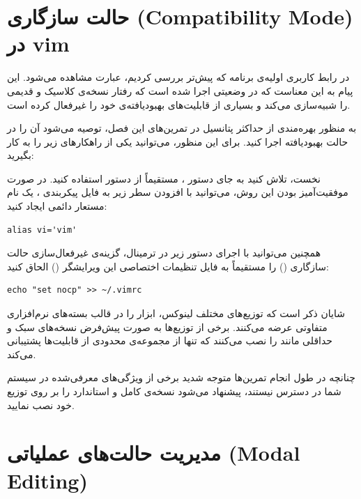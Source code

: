 \section{حالت سازگاری (Compatibility Mode) در vim}

در رابط کاربری اولیه‌ی برنامه که پیش‌تر بررسی کردیم، عبارت  مشاهده می‌شود. این پیام به این معناست که  در وضعیتی اجرا شده است که رفتار نسخه‌ی کلاسیک و قدیمی  را شبیه‌سازی می‌کند و بسیاری از قابلیت‌های بهبودیافته‌ی خود را غیرفعال کرده است.

به منظور بهره‌مندی از حداکثر پتانسیل  در تمرین‌های این فصل، توصیه می‌شود آن را در حالت بهبودیافته اجرا کنید. برای این منظور، می‌توانید یکی از راهکارهای زیر را به کار بگیرید:

نخست، تلاش کنید به جای دستور ، مستقیماً از دستور  استفاده کنید. در صورت موفقیت‌آمیز بودن این روش، می‌توانید با افزودن سطر زیر به فایل پیکربندی ، یک نام مستعار دائمی ایجاد کنید:

\begin{latin}
\begin{lstlisting}
alias vi='vim'
\end{lstlisting}
\end{latin}

همچنین می‌توانید با اجرای دستور زیر در ترمینال، گزینه‌ی غیرفعال‌سازی حالت سازگاری () را مستقیماً به فایل تنظیمات اختصاصی این ویرایشگر () الحاق کنید:

\begin{latin}
\begin{lstlisting}
echo "set nocp" >> ~/.vimrc
\end{lstlisting}
\end{latin}

شایان ذکر است که توزیع‌های مختلف لینوکس، ابزار  را در قالب بسته‌های نرم‌افزاری متفاوتی عرضه می‌کنند. برخی از توزیع‌ها به صورت پیش‌فرض نسخه‌های سبک و حداقلی مانند  را نصب می‌کنند که تنها از مجموعه‌ی محدودی از قابلیت‌ها پشتیبانی می‌کند.

چنانچه در طول انجام تمرین‌ها متوجه شدید برخی از ویژگی‌های معرفی‌شده در سیستم شما در دسترس نیستند، پیشنهاد می‌شود نسخه‌ی کامل و استاندارد  را بر روی توزیع خود نصب نمایید.

\section{مدیریت حالت‌های عملیاتی (Modal Editing)}


